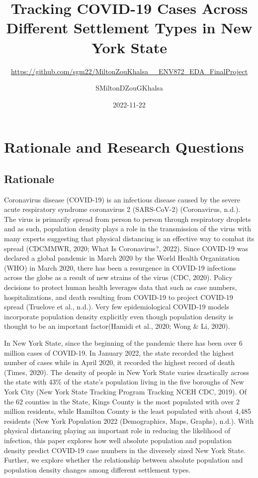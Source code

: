 \documentclass[
  12pt,
]{article}
\title{Tracking COVID-19 Cases Across Different Settlement Types in New
York State}
\subtitle{\url{https://github.com/sgm22/MiltonZouKhalsa__ENV872_EDA_FinalProject}}
\author{SMiltonDZouGKhalsa}
\date{2022-11-22}
\begin{document}
\maketitle

{
\setcounter{tocdepth}{2}
\tableofcontents
}
\newpage
\tableofcontents 
\newpage
\listoftables 
\newpage
\listoffigures 
\newpage

\hypertarget{rationale-and-research-questions}{%
\section{Rationale and Research
Questions}\label{rationale-and-research-questions}}

\hypertarget{rationale}{%
\subsection{Rationale}\label{rationale}}

Coronavirus disease (COVID-19) is an infectious disease caused by the
severe acute respiratory syndrome coronavirus 2 (SARS-CoV-2)
(Coronavirus, n.d.). The virus is primarily spread from person to person
through respiratory droplets and as such, population density plays a
role in the transmission of the virus with many experts suggesting that
physical distancing is an effective way to combat its spread (CDCMMWR,
2020; What Is Coronavirus?, 2022). Since COVID-19 was declared a global
pandemic in March 2020 by the World Health Organization (WHO) in March
2020, there has been a resurgence in COVID-19 infections across the
globe as a result of new strains of the virus (CDC, 2020). Policy
decisions to protect human health leverages data that such as case
numbers, hospitalizations, and death resulting from COVID-19 to project
COVID-19 spread (Truelove et al., n.d.). Very few epidemiological
COVID-19 models incorporate population density explicitly even though
population density is thought to be an important factor(Hamidi et al.,
2020; Wong \& Li, 2020).

In New York State, since the beginning of the pandemic there has been
over 6 million cases of COVID-19. In January 2022, the state recorded
the highest number of cases while in April 2020, it recorded the highest
record of death (Times, 2020). The density of people in New York State
varies drastically across the state with 43\% of the state's population
living in the five boroughs of New York City (New York State Tracking
Program \textbar{} Tracking \textbar{} NCEH \textbar{} CDC, 2019). Of
the 62 counties in the State, Kings County is the most populated with
over 2 million residents, while Hamilton County is the least populated
with about 4,485 residents (New York Population 2022 (Demographics,
Maps, Graphs), n.d.). With physical distancing playing an important role
in reducing the likelihood of infection, this paper explores how well
absolute population and population density predict COVID-19 case numbers
in the diversely sized New York State. Further, we explore whether the
relationship between absolute population and population density changes
among different settlement types.
\end{document}
